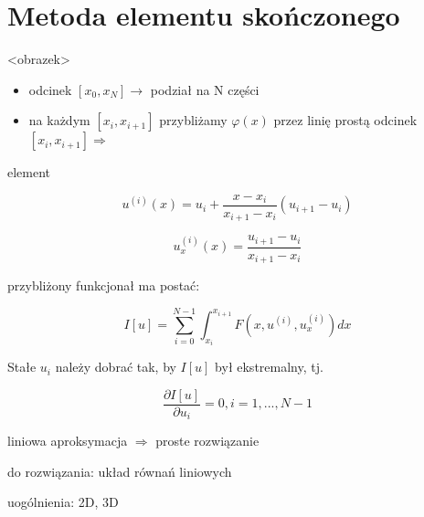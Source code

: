 \section{Metoda elementu skończonego}

<obrazek>

\begin{itemize}
	\item odcinek $[x_0, x_N] \rightarrow$ podział na N części
	\item na każdym $[x_i, x_{i+1}]$ przybliżamy $\varphi(x)$ przez linię prostą odcinek $[x_i, x_{i+1}] \Rightarrow$   
\end{itemize}

element

$$
u^{(i)}(x) = u_i + \frac{x - x_i}{x_{i+1} - x_i}(u_{i+1} - u_i)
$$

$$
u_x^{(i)}(x) = \frac{u_{i+1} - u_i}{x_{i+1} - x_i}
$$

przybliżony funkcjonał ma postać:

$$
I[u] = \sum_{i=0}^{N-1} \int_{x_i}^{x_{i+1}} F(x, u^{(i)}, u_x^{(i)} ) dx
$$

Stałe $u_i$ należy dobrać tak, by $I[u]$ był ekstremalny, tj.

$$
\frac{\partial I[u]}{\partial u_i} = 0, i = 1, ... , N-1
$$

liniowa aproksymacja $\Rightarrow$ proste rozwiązanie

do rozwiązania: układ równań liniowych

uogólnienia: 2D, 3D

